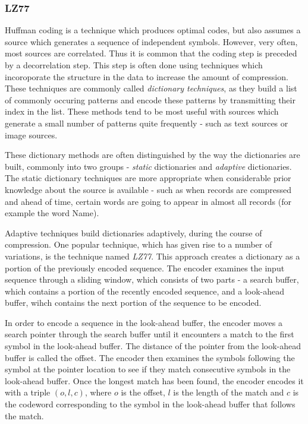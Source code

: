 \documentclass[thesis=M,english]{FITthesis}[2012/10/20]
\begin{document}
\subsubsection{LZ77}
Huffman coding is a technique which produces optimal codes, but also assumes a
source which generates a sequence of independent symbols. However, very often,
most sources are correlated. Thus it is common that the coding step is preceded by
a decorrelation step. This step is often done using techniques which incoroporate
the structure in the data to increase the amount of compression. These techniques
are commonly called \emph{dictionary techniques}, as they build a list of
commonly occuring patterns and encode these patterns by transmitting their index in
the list. These methods tend to be most useful with sources which generate a small
number of patterns quite frequently - such as text sources or image sources.\cite{datacompression}

These dictionary methods are often distinguished by the way the dictionaries are
built, commonly into two groups - \emph{static} dictionaries and \emph{adaptive}
dictionaries. The static dictionary techniques are more appropriate when considerable
prior knowledge about the source is available - such as when records are compressed
and ahead of time, certain words are going to appear in almost all records (for example
the word Name).

Adaptive techniques build dictionaries adaptively, during the course of compression. One
popular technique, which has given rise to a number of variations, is the technique
named \emph{LZ77}. This approach creates a dictionary as a portion of the previously
encoded sequence. The encoder examines the input sequence through a sliding
window, which consists of two parts - a search buffer, which contains a portion
of the recently encoded sequence, and a look-ahead buffer, wihch contains the
next portion of the sequence to be encoded.

In order to encode a sequence in the look-ahead buffer, the encoder moves a search
pointer through the search buffer until it encounters a match to the first symbol in the
look-ahead buffer. The distance of the pointer from the look-ahead buffer is called the offset.
The encoder then examines the symbols following the symbol at the
pointer location to see if they match consecutive symbols in the look-ahead buffer.
Once the longest match has been found, the encoder encodes it with a triple
$(o, l, c)$, where $o$ is the offset, $l$ is the length of the match and $c$ is
the codeword corresponding to the symbol in the look-ahead buffer that follows the match.\cite{lz77}
\end{document}
